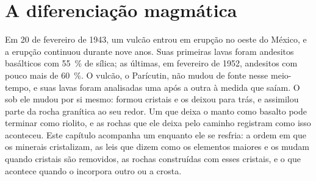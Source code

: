 \chapter{A diferenciação magmática}\label{ch:b2:magmatic-differentiation}

Em 20 de fevereiro de 1943, um vulcão entrou em erupção no oeste do México, e a erupção continuou
durante nove anos. Suas primeiras lavas foram andesitos basálticos com \qty{55}{\percent}
de sílica; as últimas, em fevereiro de 1952, andesitos com pouco mais de
\qty{60}{\percent}. O vulcão, o Parícutin, não mudou de fonte nesse
meio-tempo, e suas lavas foram analisadas uma após a outra à medida que saíam. O
 sob ele mudou por si mesmo: formou cristais e os deixou para trás, e assimilou
parte da rocha granítica ao seu redor. Um  que deixa o manto como basalto pode
terminar como riolito, e as rochas que ele deixa pelo caminho registram como isso aconteceu.
Este capítulo acompanha um  enquanto ele se resfria: a ordem em que os minerais cristalizam,
as leis que dizem como os elementos maiores e os  mudam quando cristais são removidos,
as rochas construídas com esses cristais, e o que acontece quando o  incorpora
outro  ou a crosta.

